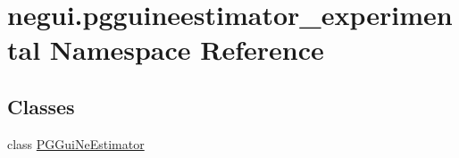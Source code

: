 \hypertarget{namespacenegui_1_1pgguineestimator__experimental}{}\section{negui.\+pgguineestimator\+\_\+experimental Namespace Reference}
\label{namespacenegui_1_1pgguineestimator__experimental}
\subsection*{Classes}
\begin{DoxyCompactItemize}
\item 
class \hyperlink{classnegui_1_1pgguineestimator__experimental_1_1PGGuiNeEstimator}{P\+G\+Gui\+Ne\+Estimator}
\end{DoxyCompactItemize}
